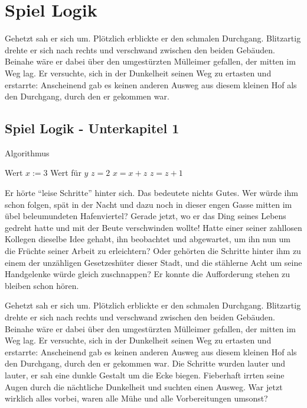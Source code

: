 
\chapter{Spiel Logik}
\label{Spiel_Logik}
%
Gehetzt sah er sich um. Plötzlich erblickte er den schmalen
Durchgang. Blitzartig drehte er sich nach rechts und verschwand
zwischen den beiden Gebäuden. Beinahe wäre er dabei über den
umgestürzten Mülleimer gefallen, der mitten im Weg lag. Er
versuchte, sich in der Dunkelheit seinen Weg zu ertasten und
erstarrte: Anscheinend gab es keinen anderen Ausweg aus diesem
kleinen Hof als den Durchgang, durch den er gekommen war.

\section{Spiel Logik - Unterkapitel 1}
\label{Spiel_Logik_-_Unterkapitel_1}
%
    \begin{algorithm}[t]
    \centering
    \caption[Ein Algorithmus]{Algorithmus} \label{algo_1}
    \begin{algorithmic}
    \REQUIRE Wert $x :=3$
    \ENSURE Wert für $y$
    \STATE $z = 2$
    \STATE $x = x + z$
    \STATE $z = z + 1$
    \ENDFOR
    \ENDWHILE
    \end{algorithmic}
    \end{algorithm}


Er hörte \enquote{leise Schritte} hinter sich. Das bedeutete
nichts Gutes. Wer würde ihm schon folgen, spät in der Nacht und
dazu noch in dieser engen Gasse mitten im übel beleumundeten
Hafenviertel? Gerade jetzt, wo er das Ding seines Lebens gedreht
hatte und mit der Beute verschwinden wollte! Hatte einer seiner
zahllosen Kollegen dieselbe Idee gehabt, ihn beobachtet und
abgewartet, um ihn nun um die Früchte seiner Arbeit zu
erleichtern? Oder gehörten die Schritte hinter ihm zu einem der
unzähligen Gesetzeshüter dieser Stadt, und die stählerne Acht um
seine Handgelenke würde gleich zuschnappen? Er konnte die
Aufforderung stehen zu bleiben
schon hören.

Gehetzt sah er sich um. Plötzlich erblickte er den schmalen
Durchgang. Blitzartig drehte er sich nach rechts und verschwand
zwischen den beiden Gebäuden. Beinahe wäre er dabei über den
umgestürzten Mülleimer gefallen, der mitten im Weg lag. Er
versuchte, sich in der Dunkelheit seinen Weg zu ertasten und
erstarrte: Anscheinend gab es keinen anderen Ausweg aus diesem
kleinen Hof als den Durchgang, durch den er gekommen war. Die
Schritte wurden lauter und lauter, er sah eine dunkle Gestalt um
die Ecke biegen. Fieberhaft irrten seine Augen durch die
nächtliche Dunkelheit und suchten einen Ausweg. War jetzt wirklich
alles vorbei, waren alle Mühe und alle Vorbereitungen umsonst?


